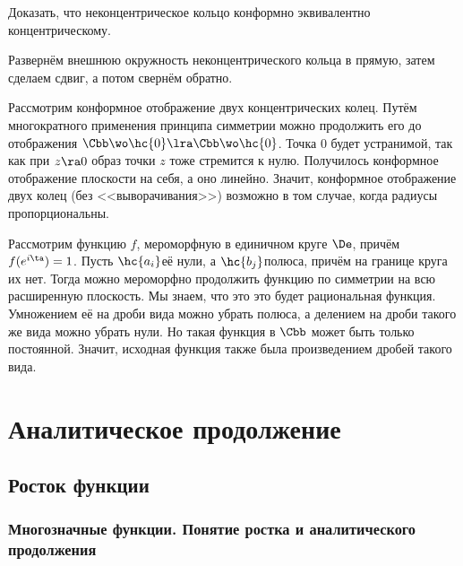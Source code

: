 \documentclass[a4paper]{article}
\newenvironment{petit}
{\par \smallskip \hrule \smallskip \footnotesize}
{\par \smallskip \hrule \smallskip}
\begin{document}
\begin{problem}
Доказать, что неконцентрическое кольцо конформно эквивалентно концентрическому.
\end{problem}
\begin{solution}
Развернём внешнюю окружность неконцентрического кольца в прямую, затем сделаем сдвиг, а потом свернём обратно.
\end{solution}

\begin{ex}
Рассмотрим конформное отображение двух концентрических колец. Путём многократного применения принципа симметрии
можно продолжить его до отображения $\Cbb\wo\hc{0} \lra \Cbb \wo\hc{0}$. Точка $0$ будет устранимой,
так как при $z\ra0$ образ точки $z$ тоже стремится к нулю. Получилось конформное отображение плоскости на себя,
а оно линейно. Значит, конформное отображение двух колец (без <<выворачивания>>) возможно в том случае, когда
радиусы пропорциональны.
\end{ex}


Рассмотрим функцию $f$, мероморфную в единичном круге $\De$, причём $f(e^{i\ta})=1$. Пусть $\hc{a_i}$\т её нули,
а $\hc{b_j}$\т полюса, причём на границе круга их нет.
Тогда можно мероморфно продолжить функцию по симметрии на всю расширенную плоскость. Мы знаем, что это это будет
рациональная функция. Умножением её на дроби вида
можно убрать полюса, а делением на дроби такого же вида можно убрать нули. Но такая функция в $\Cbb$ может быть только
постоянной. Значит, исходная функция также была произведением дробей такого вида.

\section{Аналитическое продолжение}

\subsection{Росток функции}

\subsubsection{Многозначные функции. Понятие ростка и аналитического продолжения}
\end{document}
